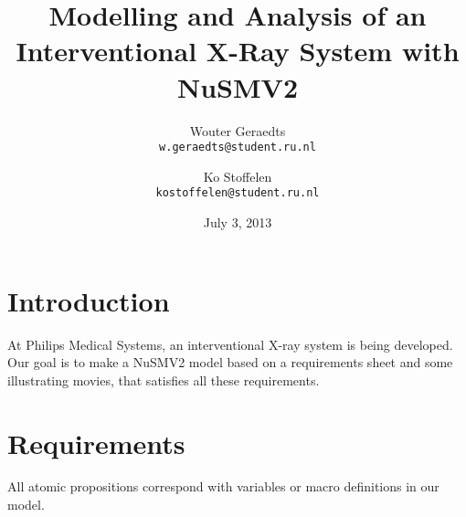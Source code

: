 \documentclass[a4paper,10pt]{article}
\title{Modelling and Analysis of an Interventional X-Ray System with NuSMV2}
\author{
	Wouter Geraedts \\ \small{\texttt{w.geraedts@student.ru.nl}} \and
	Ko Stoffelen     \\ \small{\texttt{kostoffelen@student.ru.nl}}
}
\date{July 3, 2013}
\begin{document}
	\maketitle

	\section{Introduction}
	At Philips Medical Systems, an interventional X-ray system is being developed.
	Our goal is to make a NuSMV2 model based on a requirements sheet and some illustrating movies, that satisfies all these requirements.

	\section{Requirements}
	All atomic propositions correspond with variables or macro definitions in our model.
	
\end{document}
